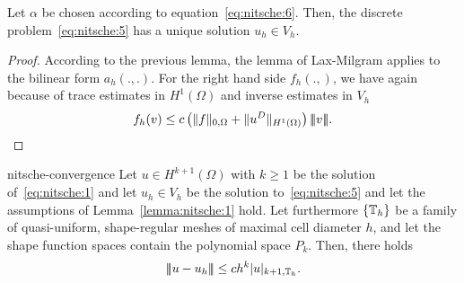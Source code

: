 \begin{corollary}
  Let $\alpha$ be chosen according to
  equation~\eqref{eq:nitsche:6}. Then, the discrete
  problem~\eqref{eq:nitsche:5} has a unique solution $u_h\in V_h$.
\end{corollary}

\begin{proof}
  According to the previous lemma, the lemma of Lax-Milgram applies to
  the bilinear form $a_h(.,.)$. For the right hand side $f_h(.,)$, we
  have again because of trace estimates in $H^1(\Omega)$ and inverse
  estimates in $V_h$
  \begin{gather*}
    f_h(v) \le c \left(\lVert f\rVert_{0,\Omega}+
      \lVert u^D\rVert_{H^1(\Omega)}\right)\vert\!\lvert\!\lvert v\rvert\!\rvert\!\rvert.
  \end{gather*}
\end{proof}

\begin{Theorem}{nitsche-convergence}
\label{theorem:nitsche:1}
  Let $u \in H^{k+1}(\Omega)$ with $k\ge 1$ be the solution
  of~\eqref{eq:nitsche:1} and let $u_h\in V_h$ be the solution
  to~\eqref{eq:nitsche:5} and let the assumptions of
  Lemma~\ref{lemma:nitsche:1} hold. Let furthermore $\{\mathbb T_h\}$ be a
  family of quasi-uniform, shape-regular meshes of maximal cell
  diameter $h$, and let the shape function spaces contain the
  polynomial space $P_k$. Then, there holds
  \begin{gather}
    \vert\!\lvert\!\lvert u-u_h\rvert\!\rvert\!\rvert \le c h^k |u|_{k+1,\mathbb T_h}.
  \end{gather}
\end{Theorem}

